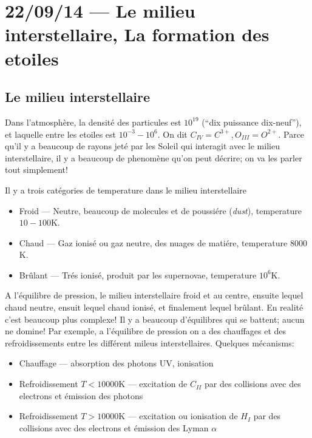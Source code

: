 \documentclass[10pt]{report}
\begin{document}
\chapter{22/09/14 --- Le milieu interstellaire, La formation des etoiles}

\section{Le milieu interstellaire}

Dans l'atmosph\`ere, la densit\'e des particules est $10^{19}$ (``dix puissance dix-neuf''), et laquelle entre les etoiles est $10^{-3}-10^{6}$. On dit $C_{IV} = C^{3+}, O_{III} = O^{2+}$. Parce qu'il y a beaucoup de rayons jet\'e par les Soleil qui interagit avec le milieu interstellaire, il y a beaucoup de phenom\`ene qu'on peut d\'ecrire; on va les parler tout simplement!

Il y a trois cat\'egories de temperature dans le milieu interstellaire
\begin{itemize}
    \item Froid --- Neutre, beaucoup de molecules et de poussi\'ere (\emph{dust}), temperature $10-100$K.
    \item Chaud --- Gaz ionis\'e ou gaz neutre, des nuages de mati\'ere, temperature $8000$K.
    \item Br\^ulant --- Tr\'es ionis\'e, produit par les supernovae, temperature $10^6$K.
\end{itemize}

A l'\'equilibre de pression, le milieu interstellaire froid et au centre, ensuite lequel chaud neutre, ensuit lequel chaud ionis\'e, et finalement lequel br\^ulant. En realit\'e c'est beaucoup plus complexe! Il y a beaucoup d'\'equilibres qui se battent; aucun ne domine! Par exemple, a l'\'equilibre de pression on a des chauffages et des refroidissements entre les diff\'erent mileus interstellaires. Quelques m\'ecanisms:
\begin{itemize}
    \item Chauffage --- absorption des photons UV, ionisation
    \item Refroidissement $T < 10000$K --- excitation de $C_{II}$ par des collisions avec des electrons et \'emission des photons
    \item Refroidissement $T > 10000$K --- excitation ou ionisation de $H_{I}$ par des collisions avec des electrons et \'emission des Lyman $\alpha$
\end{itemize}
\end{document}
